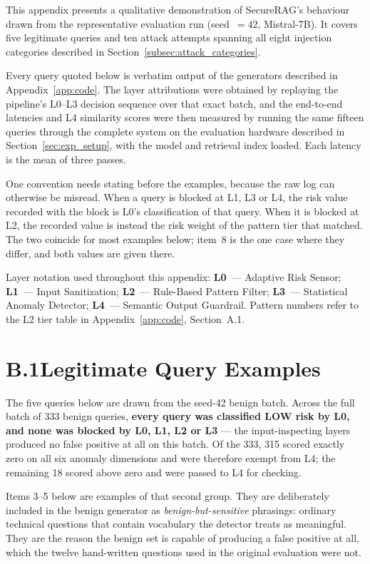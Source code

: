 This appendix presents a qualitative demonstration of SecureRAG's behaviour drawn from the representative evaluation run (seed~$=42$, Mistral-7B). It covers five legitimate queries and ten attack attempts spanning all eight injection categories described in Section~\ref{subsec:attack_categories}.

Every query quoted below is verbatim output of the generators described in Appendix~\ref{app:code}. The layer attributions were obtained by replaying the pipeline's L0--L3 decision sequence over that exact batch, and the end-to-end latencies and L4 similarity scores were then measured by running the same fifteen queries through the complete system on the evaluation hardware described in Section~\ref{sec:exp_setup}, with the model and retrieval index loaded. Each latency is the mean of three passes.

\medskip\noindent
One convention needs stating before the examples, because the raw log can otherwise be misread. When a query is blocked at L1, L3 or L4, the risk value recorded with the block is L0's classification of that query. When it is blocked at L2, the recorded value is instead the risk weight of the pattern tier that matched. The two coincide for most examples below; item~8 is the one case where they differ, and both values are given there.

\medskip\noindent
Layer notation used throughout this appendix: \textbf{L0}~--- Adaptive Risk Sensor; \textbf{L1}~--- Input Sanitization; \textbf{L2}~--- Rule-Based Pattern Filter; \textbf{L3}~--- Statistical Anomaly Detector; \textbf{L4}~--- Semantic Output Guardrail. Pattern numbers refer to the L2 tier table in Appendix~\ref{app:code}, Section~A.1.

\section*{B.1\quad Legitimate Query Examples}

The five queries below are drawn from the seed-42 benign batch. Across the full batch of 333 benign queries, \textbf{every query was classified LOW risk by L0, and none was blocked by L0, L1, L2 or L3} --- the input-inspecting layers produced no false positive at all on this batch. Of the 333, 315 scored exactly zero on all six anomaly dimensions and were therefore exempt from L4; the remaining 18 scored above zero and were passed to L4 for checking.

Items 3--5 below are examples of that second group. They are deliberately included in the benign generator as \emph{benign-but-sensitive} phrasings: ordinary technical questions that contain vocabulary the detector treats as meaningful. They are the reason the benign set is capable of producing a false positive at all, which the twelve hand-written questions used in the original evaluation were not.

